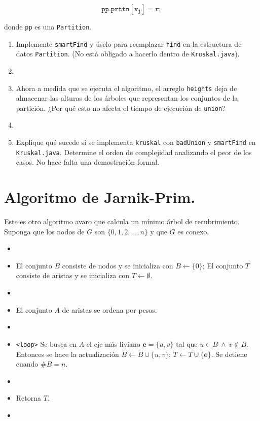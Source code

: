 \documentclass{amsart}
\begin{document}
\begin{large}
$$
\mathtt{pp.prttn[v_j] = r;} 
$$

donde \texttt{pp} es una \texttt{Partition}.

\begin{enumerate}
    \item Implemente \texttt{smartFind} y úselo para reemplazar \texttt{find} en la estructura de datos \texttt{Partition}. (No está obligado a hacerlo dentro de \texttt{Kruskal.java}).
    \item[] 
    \item Ahora a medida que se ejecuta el algoritmo, el arreglo \texttt{heights} deja de almacenar las alturas de los árboles que representan los conjuntos de la partición. ¿Por qué esto no afecta el tiempo de ejecución de \texttt{union}?
    \item[] 
    \item Explique qué sucede si se implementa \texttt{kruskal} con \texttt{badUnion} y \texttt{smartFind} en \texttt{Kruskal.java}. Determine el orden de complejidad analizando el peor de los casos. No hace falta una demostración formal.
\end{enumerate}

\bigskip

\section{Algoritmo de Jarnik-Prim.}

Este es otro algoritmo avaro que calcula un mínimo árbol de recubrimiento. Suponga que los nodos de $G$ son $\{0,1,2,...,n\}$ y que $G$ es conexo.

\begin{itemize}
    \item[] 
    \item El conjunto $B$ consiste de nodos y se inicializa con $B \leftarrow \{0\}$; El conjunto $T$ consiste de aristas y se inicializa con $T \leftarrow \emptyset$.
    \item[] 
    \item El conjunto $A$ de aristas se ordena por pesos.
    \item[] 
    \item \texttt{<loop>} Se busca en $A$ el eje más liviano $\mathbf{e} = \{u,v\}$ tal que $u \in B \ \land \ v \notin B$. Entonces se hace la actualización $B \leftarrow B \cup \{u,v\}$; $T \leftarrow T \cup \{\mathbf{e}\}$. Se detiene cuando $\# B = n$.
    \item[] 
    \item Retorna $T$.
    \item[] 
\end{itemize}


\end{large}
\end{document}

